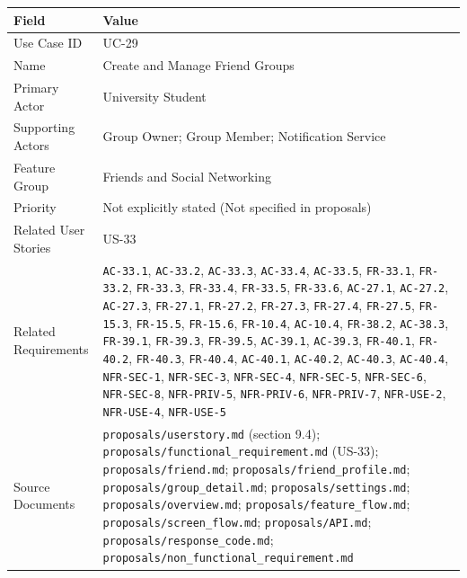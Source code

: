 \documentclass[12pt]{article}
\renewcommand{\baselinestretch}{1.5}
\begin{document}
\begingroup
\small
\renewcommand{\baselinestretch}{1.0}\selectfont
\renewcommand{\arraystretch}{1.15}
\setlength{\tabcolsep}{6pt}
\begin{longtable}{|>{\raggedright\arraybackslash}p{}|>{\raggedright\arraybackslash}p{}|}
\hline
\textbf{Field} & \textbf{Value} \\ \hline
\endhead
Use Case ID & UC-29 \\ \hline
Name & Create and Manage Friend Groups \\ \hline
Primary Actor & University Student \\ \hline
Supporting Actors & Group Owner; Group Member; Notification Service \\ \hline
Feature Group & Friends and Social Networking \\ \hline
Priority & Not explicitly stated (Not specified in proposals) \\ \hline
Related User Stories & US-33 \\ \hline
Related Requirements & \texttt{AC-33.1}, \texttt{AC-33.2}, \texttt{AC-33.3}, \texttt{AC-33.4}, \texttt{AC-33.5}, \texttt{FR-33.1}, \texttt{FR-33.2}, \texttt{FR-33.3}, \texttt{FR-33.4}, \texttt{FR-33.5}, \texttt{FR-33.6}, \texttt{AC-27.1}, \texttt{AC-27.2}, \texttt{AC-27.3}, \texttt{FR-27.1}, \texttt{FR-27.2}, \texttt{FR-27.3}, \texttt{FR-27.4}, \texttt{FR-27.5}, \texttt{FR-15.3}, \texttt{FR-15.5}, \texttt{FR-15.6}, \texttt{FR-10.4}, \texttt{AC-10.4}, \texttt{FR-38.2}, \texttt{AC-38.3}, \texttt{FR-39.1}, \texttt{FR-39.3}, \texttt{FR-39.5}, \texttt{AC-39.1}, \texttt{AC-39.3}, \texttt{FR-40.1}, \texttt{FR-40.2}, \texttt{FR-40.3}, \texttt{FR-40.4}, \texttt{AC-40.1}, \texttt{AC-40.2}, \texttt{AC-40.3}, \texttt{AC-40.4}, \texttt{NFR-SEC-1}, \texttt{NFR-SEC-3}, \texttt{NFR-SEC-4}, \texttt{NFR-SEC-5}, \texttt{NFR-SEC-6}, \texttt{NFR-SEC-8}, \texttt{NFR-PRIV-5}, \texttt{NFR-PRIV-6}, \texttt{NFR-PRIV-7}, \texttt{NFR-USE-2}, \texttt{NFR-USE-4}, \texttt{NFR-USE-5} \\ \hline
Source Documents & \texttt{proposals/userstory.md} (section 9.4); \texttt{proposals/functional\_requirement.md} (US-33); \texttt{proposals/friend.md}; \texttt{proposals/friend\_profile.md}; \texttt{proposals/group\_detail.md}; \texttt{proposals/settings.md}; \texttt{proposals/overview.md}; \texttt{proposals/feature\_flow.md}; \texttt{proposals/screen\_flow.md}; \texttt{proposals/API.md}; \texttt{proposals/response\_code.md}; \texttt{proposals/non\_functional\_requirement.md} \\ \hline
\end{longtable}
\endgroup
\par\medskip
\end{document}
